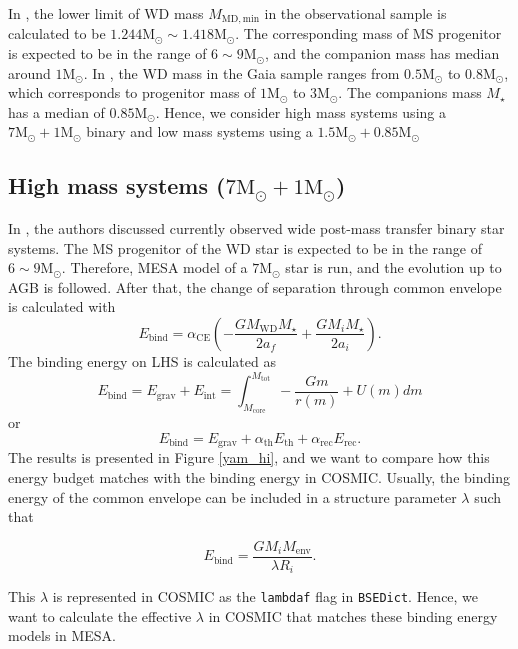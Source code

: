 \documentclass[12pt]{article}
\newcommand{\Msun}{\mathrm{M_{\odot}}}
\newcommand{\MWD}{M_{\mathrm{WD}}}
\newcommand{\Mstar}{M_{\star}}
\newcommand{\alphace}{\alpha_{\mathrm{CE}}}
\newcommand{\alphath}{\alpha_{\mathrm{th}}}
\newcommand{\alpharec}{\alpha_{\mathrm{rec}}}
\newcommand{\Ebind}{E_{\mathrm{bind}}}
\begin{document}
In \cite{yamaguchi_hi}, the lower limit of WD mass $M_{\mathrm{MD, min}}$ in the observational sample is calculated to be $1.244\Msun \sim 1.418\Msun$. The corresponding mass of MS progenitor is expected to be in the range of $6 \sim 9 \Msun$, and the companion mass has median around $1\Msun$. In \cite{yamaguchi_lo}, the WD mass in the Gaia sample ranges from $0.5\Msun$ to $0.8\Msun$, which corresponds to progenitor mass of $1 \Msun$ to $3 \Msun$. The companions mass $\Mstar$ has a median of $0.85 \Msun$. Hence, we consider high mass systems using a $7\Msun + 1\Msun$ binary and low mass systems using a $1.5\Msun + 0.85\Msun$

\subsection{High mass systems ($7\Msun + 1\Msun$)}
In \cite{yamaguchi_hi}, the authors discussed currently observed wide post-mass transfer binary star systems. The MS progenitor of the WD star is expected to be in the range of $6 \sim 9 \Msun$. Therefore, MESA model of a $7\Msun$ star is run, and the evolution up to AGB is followed. After that, the change of separation through common envelope is calculated with
\[
E_{\mathrm{bind}} = \alphace \left(-\frac{G\MWD \Mstar}{2a_f}+\frac{GM_i \Mstar}{2a_i}\right).
\]
The binding energy on LHS is calculated as
\[
E_{\mathrm{bind}} = E_{\mathrm{grav}} + E_{\mathrm{int}} = \int_{M_{\mathrm{core}}}^{M_{\mathrm{tot}}} -\frac{Gm}{r(m)} + U(m) dm
\]
or
\[
	E_{\mathrm{bind}} = E_{\mathrm{grav}} + \alphath E_{\mathrm{th}} + \alpharec E_{\mathrm{rec}}.
\]
The results is presented in Figure \ref{yam_hi}, and we want to compare how this energy budget matches with the binding energy in COSMIC. Usually, the binding energy of the common envelope can be included in a structure parameter $\lambda$ such that 

\begin{equation}
	\Ebind = \frac{G M_i M_{\mathrm{env}}}{\lambda R_i}.   
	\label{ebind}
\end{equation}

This $\lambda$ is represented in COSMIC as the \verb|lambdaf| flag in \verb|BSEDict|. Hence, we want to calculate the effective $\lambda$ in COSMIC that matches these binding energy models in MESA.
\end{document}
